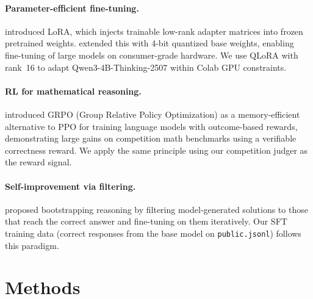 \documentclass{article}
\begin{document}
\paragraph{Parameter-efficient fine-tuning.}
\citet{hu2022lora} introduced LoRA, which injects trainable low-rank adapter matrices into frozen pretrained weights. \citet{dettmers2024qlora} extended this with 4-bit quantized base weights, enabling fine-tuning of large models on consumer-grade hardware. We use QLoRA with rank~16 to adapt Qwen3-4B-Thinking-2507 within Colab GPU constraints.

\paragraph{RL for mathematical reasoning.}
\citet{shao2024deepseekmath} introduced GRPO (Group Relative Policy Optimization) as a memory-efficient alternative to PPO for training language models with outcome-based rewards, demonstrating large gains on competition math benchmarks using a verifiable correctness reward. We apply the same principle using our competition judger as the reward signal.

\paragraph{Self-improvement via filtering.}
\citet{zelikman2022star} proposed bootstrapping reasoning by filtering model-generated solutions to those that reach the correct answer and fine-tuning on them iteratively. Our SFT training data (correct responses from the base model on \texttt{public.jsonl}) follows this paradigm.


\section{Methods}
\label{sec:methods}
\end{document}
